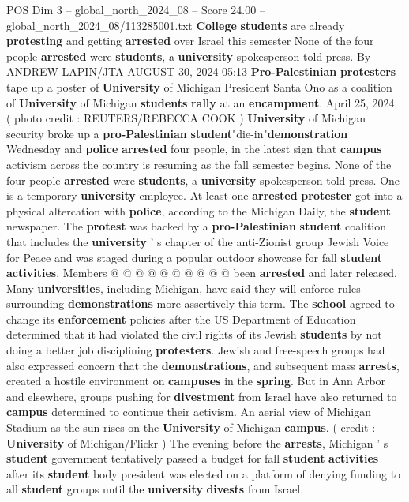 \begin{textsample}{POS Dim 3 – global\_north\_2024\_08 – Score 24.00 – global\_north\_2024\_08/113285001.txt}  \label{ex:f3_pos_132}
\textbf{College} \textbf{students} are already \textbf{protesting} and getting \textbf{arrested} over Israel this semester None of the four people \textbf{arrested} were \textbf{students}, a \textbf{university} spokesperson told press.
By ANDREW LAPIN/JTA AUGUST 30, 2024 05:13 \textbf{Pro-Palestinian} \textbf{protesters} tape up a poster of \textbf{University} of Michigan President Santa Ono as a coalition of \textbf{University} of Michigan \textbf{students} \textbf{rally} at an \textbf{encampment}.
April 25, 2024. ( photo credit : REUTERS/REBECCA COOK ) \textbf{University} of Michigan security broke up a \textbf{pro-Palestinian} \textbf{student}"die-in"\textbf{demonstration} Wednesday and \textbf{police} \textbf{arrested} four people, in the latest sign that \textbf{campus} activism across the country is resuming as the fall semester begins.
None of the four people \textbf{arrested} were \textbf{students}, a \textbf{university} spokesperson told press.
One is a temporary \textbf{university} employee.
At least one \textbf{arrested} \textbf{protester} got into a physical altercation with \textbf{police}, according to the Michigan Daily, the \textbf{student} newspaper.
The \textbf{protest} was backed by a \textbf{pro-Palestinian} \textbf{student} coalition that includes the \textbf{university} ' s chapter of the anti-Zionist group Jewish Voice for Peace and was staged during a popular outdoor showcase for fall \textbf{student} \textbf{activities}.
Members @ @ @ @ @ @ @ @ @ @ been \textbf{arrested} and later released.
Many \textbf{universities}, including Michigan, have said they will enforce rules surrounding \textbf{demonstrations} more assertively this term.
The \textbf{school} agreed to change its \textbf{enforcement} policies after the US Department of Education determined that it had violated the civil rights of its Jewish \textbf{students} by not doing a better job disciplining \textbf{protesters}.
Jewish and free-speech groups had also expressed concern that the \textbf{demonstrations}, and subsequent mass \textbf{arrests}, created a hostile environment on \textbf{campuses} in the \textbf{spring}.
But in Ann Arbor and elsewhere, groups pushing for \textbf{divestment} from Israel have also returned to \textbf{campus} determined to continue their activism.
An aerial view of Michigan Stadium as the sun rises on the \textbf{University} of Michigan \textbf{campus}. ( credit : \textbf{University} of Michigan/Flickr ) The evening before the \textbf{arrests}, Michigan ' s \textbf{student} government tentatively passed a budget for fall \textbf{student} \textbf{activities} after its \textbf{student} body president was elected on a platform of denying funding to all \textbf{student} groups until the \textbf{university} \textbf{divests} from Israel.

\end{textsample}
